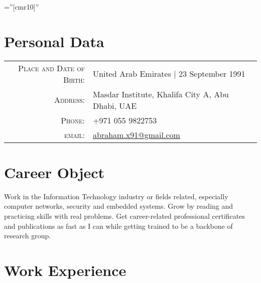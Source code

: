 \documentclass[a4paper,10pt]{article} %
\begin{document}
\pagestyle{empty} %

\font\fb=''[cmr10]'' %


\par{\bigskip\par} %

\section{Personal Data}

\begin{tabular}{rl}
\textsc{Place and Date of Birth:} & United Arab Emirates  | 23 September 1991 \\
\textsc{Address:} & Masdar Institute, Khalifa City A, Abu Dhabi, UAE \\
\textsc{Phone:} & +971 055 9822753\\
\textsc{email:} & \href{mailto:abraham.x91@gmail.com}{abraham.x91@gmail.com}
\end{tabular}


\section{Career Object}
\label{sec:career-object}
Work in the Information Technology industry or fields related,
especially computer networks, security and embedded systems. Grow by
reading and practicing skills with real problems. Get career-related
professional certificates and publications as fast as I can while
getting trained to be a backbone of research group.





\section{Work Experience}
\end{document}
